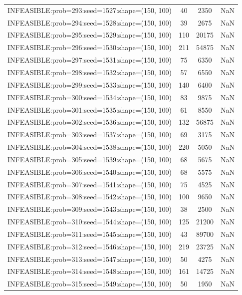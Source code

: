\begin{longtable}{lccc}
INFEASIBLE:prob=293:seed=1527:shape=(150, 100) &    40 &  2350 &    NaN \\
INFEASIBLE:prob=294:seed=1528:shape=(150, 100) &    39 &  2675 &    NaN \\
INFEASIBLE:prob=295:seed=1529:shape=(150, 100) &   110 & 20175 &    NaN \\
INFEASIBLE:prob=296:seed=1530:shape=(150, 100) &   211 & 54875 &    NaN \\
INFEASIBLE:prob=297:seed=1531:shape=(150, 100) &    75 &  6350 &    NaN \\
INFEASIBLE:prob=298:seed=1532:shape=(150, 100) &    57 &  6550 &    NaN \\
INFEASIBLE:prob=299:seed=1533:shape=(150, 100) &   140 &  6400 &    NaN \\
INFEASIBLE:prob=300:seed=1534:shape=(150, 100) &    83 &  9875 &    NaN \\
INFEASIBLE:prob=301:seed=1535:shape=(150, 100) &    61 &  8550 &    NaN \\
INFEASIBLE:prob=302:seed=1536:shape=(150, 100) &   132 & 56875 &    NaN \\
INFEASIBLE:prob=303:seed=1537:shape=(150, 100) &    69 &  3175 &    NaN \\
INFEASIBLE:prob=304:seed=1538:shape=(150, 100) &   220 &  5050 &    NaN \\
INFEASIBLE:prob=305:seed=1539:shape=(150, 100) &    68 &  5675 &    NaN \\
INFEASIBLE:prob=306:seed=1540:shape=(150, 100) &    68 &  5575 &    NaN \\
INFEASIBLE:prob=307:seed=1541:shape=(150, 100) &    75 &  4525 &    NaN \\
INFEASIBLE:prob=308:seed=1542:shape=(150, 100) &   100 &  9650 &    NaN \\
INFEASIBLE:prob=309:seed=1543:shape=(150, 100) &    38 &  2500 &    NaN \\
INFEASIBLE:prob=310:seed=1544:shape=(150, 100) &   125 & 21200 &    NaN \\
INFEASIBLE:prob=311:seed=1545:shape=(150, 100) &    43 & 89700 &    NaN \\
INFEASIBLE:prob=312:seed=1546:shape=(150, 100) &   219 & 23725 &    NaN \\
INFEASIBLE:prob=313:seed=1547:shape=(150, 100) &    50 &  4275 &    NaN \\
INFEASIBLE:prob=314:seed=1548:shape=(150, 100) &   161 & 14725 &    NaN \\
INFEASIBLE:prob=315:seed=1549:shape=(150, 100) &    50 &  1950 &    NaN \\

\end{longtable}
